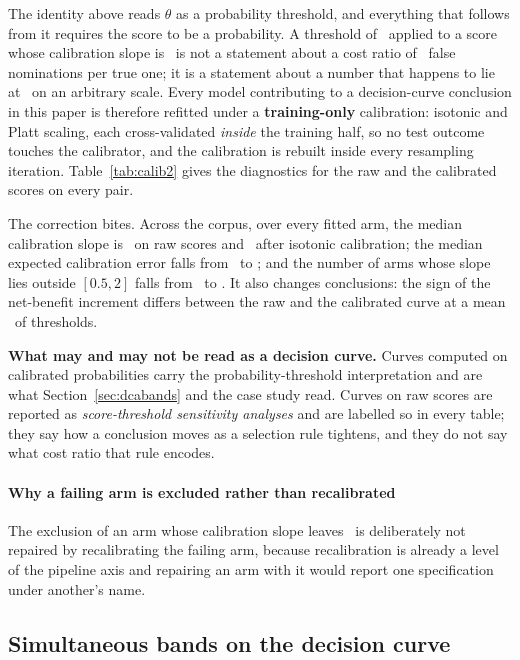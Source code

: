 The identity above reads $\theta$ as a probability threshold, and everything
that follows from it requires the score to be a probability. A threshold of
\thetaBase\ applied to a score whose calibration slope is \slopeWorstRaw\ is
not a statement about a cost ratio of \ratioBase\ false nominations per true
one; it is a statement about a number that happens to lie at \thetaBase\ on an
arbitrary scale. Every model contributing to a decision-curve conclusion in
this paper is therefore refitted under a \textbf{training-only} calibration:
isotonic and Platt scaling, each cross-validated \emph{inside} the training
half, so no test outcome touches the calibrator, and the calibration is
rebuilt inside every resampling iteration. Table~\ref{tab:calib2} gives the
diagnostics for the raw and the calibrated scores on every pair.

The correction bites. Across the corpus, over every fitted arm, the median
calibration slope is \slopeRawMedian\ on raw scores and \slopeIsoMedian\ after isotonic
calibration; the median expected calibration error falls from \eceRawMedian\
to \eceIsoMedian; and the number of arms whose slope lies outside $[0.5, 2]$
falls from \nSlopeOutRaw\ to \nSlopeOutIso. It also changes conclusions: the
sign of the net-benefit increment differs between the raw and the calibrated
curve at a mean \dcaSignChangePct\ of thresholds.

\textbf{What may and may not be read as a decision curve.} Curves computed on
calibrated probabilities carry the probability-threshold interpretation and
are what Section~\ref{sec:dcabands} and the case study read. Curves on raw
scores are reported as \emph{score-threshold sensitivity analyses} and are
labelled so in every table; they say how a conclusion moves as a selection
rule tightens, and they do not say what cost ratio that rule encodes.

\paragraph{Why a failing arm is excluded rather than recalibrated}
The exclusion of an arm whose calibration slope leaves \calSlopeWindow\ is
deliberately not repaired by recalibrating the failing arm, because
recalibration is already a level of the pipeline axis and repairing an arm
with it would report one specification under another's name.

\subsection{Simultaneous bands on the decision curve}
\label{app:dcabandsfull}

